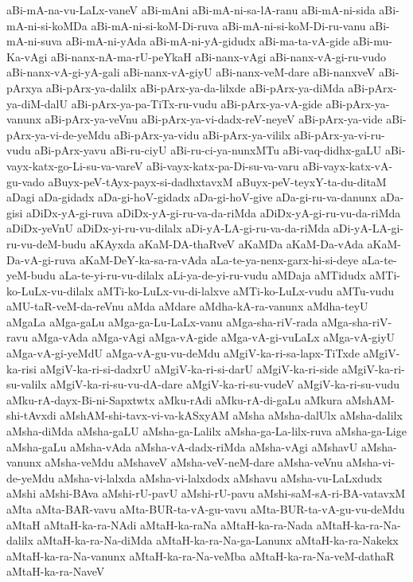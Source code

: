 {aBi-mA-na-vu-LaLx-vaneV
aBi-mAni
aBi-mA-ni-sa-lA-ranu
aBi-mA-ni-sida
aBi-mA-ni-si-koMDa
aBi-mA-ni-si-koM-Di-ruva
aBi-mA-ni-si-koM-Di-ru-vanu
aBi-mA-ni-suva
aBi-mA-ni-yAda
aBi-mA-ni-yA-gidudx
aBi-ma-ta-vA-gide
aBi-mu-Ka-vAgi
aBi-nanx-nA-ma-rU-peYkaH
aBi-nanx-vAgi
aBi-nanx-vA-gi-ru-vudo
aBi-nanx-vA-gi-yA-gali
aBi-nanx-vA-giyU
aBi-nanx-veM-dare
aBi-nanxveV
aBi-pArxya
aBi-pArx-ya-dalilx
aBi-pArx-ya-da-lilxde
aBi-pArx-ya-diMda
aBi-pArx-ya-diM-dalU
aBi-pArx-ya-pa-TiTx-ru-vudu
aBi-pArx-ya-vA-gide
aBi-pArx-ya-vanunx
aBi-pArx-ya-veVnu
aBi-pArx-ya-vi-dadx-reV-neyeV
aBi-pArx-ya-vide
aBi-pArx-ya-vi-de-yeMdu
aBi-pArx-ya-vidu
aBi-pArx-ya-vililx
aBi-pArx-ya-vi-ru-vudu
aBi-pArx-yavu
aBi-ru-ciyU
aBi-ru-ci-ya-nunxMTu
aBi-vaq-didhx-gaLU
aBi-vayx-katx-go-Li-su-va-vareV
aBi-vayx-katx-pa-Di-su-va-varu
aBi-vayx-katx-vA-gu-vado
aBuyx-peV-tAyx-payx-si-dadhxtavxM
aBuyx-peV-teyxY-ta-du-ditaM
aDagi
aDa-gidadx
aDa-gi-hoV-gidadx
aDa-gi-hoV-give
aDa-gi-ru-va-danunx
aDa-gisi
aDiDx-yA-gi-ruva
aDiDx-yA-gi-ru-va-da-riMda
aDiDx-yA-gi-ru-vu-da-riMda
aDiDx-yeVnU
aDiDx-yi-ru-vu-dilalx
aDi-yA-LA-gi-ru-va-da-riMda
aDi-yA-LA-gi-ru-vu-deM-budu
aKAyxda
aKaM-DA-thaRveV
aKaMDa
aKaM-Da-vAda
aKaM-Da-vA-gi-ruva
aKaM-DeY-ka-sa-ra-vAda
aLa-te-ya-nenx-garx-hi-si-deye
aLa-te-yeM-budu
aLa-te-yi-ru-vu-dilalx
aLi-ya-de-yi-ru-vudu
aMDaja
aMTidudx
aMTi-ko-LuLx-vu-dilalx
aMTi-ko-LuLx-vu-di-lalxve
aMTi-ko-LuLx-vudu
aMTu-vudu
aMU-taR-veM-da-reVnu
aMda
aMdare
aMdha-kA-ra-vanunx
aMdha-teyU
aMgaLa
aMga-gaLu
aMga-ga-Lu-LaLx-vanu
aMga-sha-riV-rada
aMga-sha-riV-ravu
aMga-vAda
aMga-vAgi
aMga-vA-gide
aMga-vA-gi-vuLaLx
aMga-vA-giyU
aMga-vA-gi-yeMdU
aMga-vA-gu-vu-deMdu
aMgiV-ka-ri-sa-lapx-TiTxde
aMgiV-ka-risi
aMgiV-ka-ri-si-dadxrU
aMgiV-ka-ri-si-darU
aMgiV-ka-ri-side
aMgiV-ka-ri-su-valilx
aMgiV-ka-ri-su-vu-dA-dare
aMgiV-ka-ri-su-vudeV
aMgiV-ka-ri-su-vudu
aMku-rA-dayx-Bi-ni-Sapxtwtx
aMku-rAdi
aMku-rA-di-gaLu
aMkura
aMshAM-shi-tAvxdi
aMshAM-shi-tavx-vi-va-kASxyAM
aMsha
aMsha-dalUlx
aMsha-dalilx
aMsha-diMda
aMsha-gaLU
aMsha-ga-Lalilx
aMsha-ga-La-lilx-ruva
aMsha-ga-Lige
aMsha-gaLu
aMsha-vAda
aMsha-vA-dadx-riMda
aMsha-vAgi
aMshavU
aMsha-vanunx
aMsha-veMdu
aMshaveV
aMsha-veV-neM-dare
aMsha-veVnu
aMsha-vi-de-yeMdu
aMsha-vi-lalxda
aMsha-vi-lalxdodx
aMshavu
aMsha-vu-LaLxdudx
aMshi
aMshi-BAva
aMshi-rU-pavU
aMshi-rU-pavu
aMshi-saM-sA-ri-BA-vatavxM
aMta
aMta-BAR-vavu
aMta-BUR-ta-vA-gu-vavu
aMta-BUR-ta-vA-gu-vu-deMdu
aMtaH
aMtaH-ka-ra-NAdi
aMtaH-ka-raNa
aMtaH-ka-ra-Nada
aMtaH-ka-ra-Na-dalilx
aMtaH-ka-ra-Na-diMda
aMtaH-ka-ra-Na-ga-Lanunx
aMtaH-ka-ra-Nakekx
aMtaH-ka-ra-Na-vanunx
aMtaH-ka-ra-Na-veMba
aMtaH-ka-ra-Na-veM-dathaR
aMtaH-ka-ra-NaveV
}
